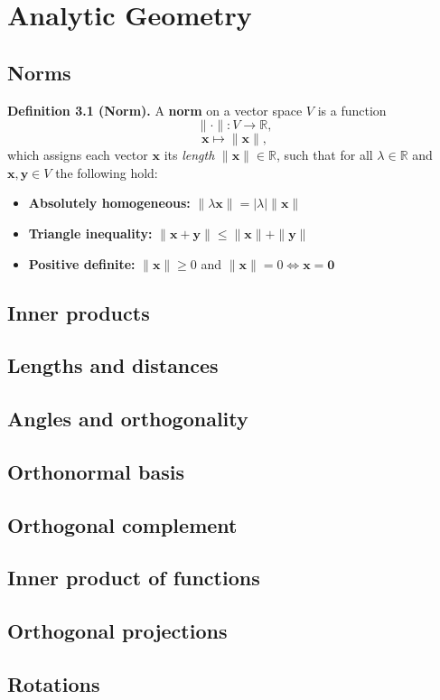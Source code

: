 \section{Analytic Geometry}

\subsection{Norms}
\textbf{Definition 3.1 (Norm).}
A \textbf{norm} on a vector space \( V \) is a function
\[
\|\cdot\| : V \to \mathbb{R},
\]
\[
\boldsymbol{x} \mapsto \|\boldsymbol{x}\|,
\]
which assigns each vector \( \boldsymbol{x} \) its \textit{length} \( \|\boldsymbol{x}\| \in \mathbb{R} \), such that for all \( \lambda \in \mathbb{R} \) and \( \boldsymbol{x}, \boldsymbol{y} \in V \) the following hold:
\begin{itemize}
    \item \textbf{Absolutely homogeneous:}
    \( \|\lambda \boldsymbol{x}\| = |\lambda| \|\boldsymbol{x}\| \)

    \item \textbf{Triangle inequality:}
    \( \|\boldsymbol{x} + \boldsymbol{y}\| \leq \|\boldsymbol{x}\| + \|\boldsymbol{y}\| \)

    \item \textbf{Positive definite:}
    \( \|\boldsymbol{x}\| \geq 0 \) and \( \|\boldsymbol{x}\| = 0 \iff \boldsymbol{x} = \boldsymbol{0} \)
\end{itemize}

\subsection{Inner products}
\subsection{Lengths and distances}
\subsection{Angles and orthogonality}
\subsection{Orthonormal basis}
\subsection{Orthogonal complement}
\subsection{Inner product of functions}
\subsection{Orthogonal projections}
\subsection{Rotations}
